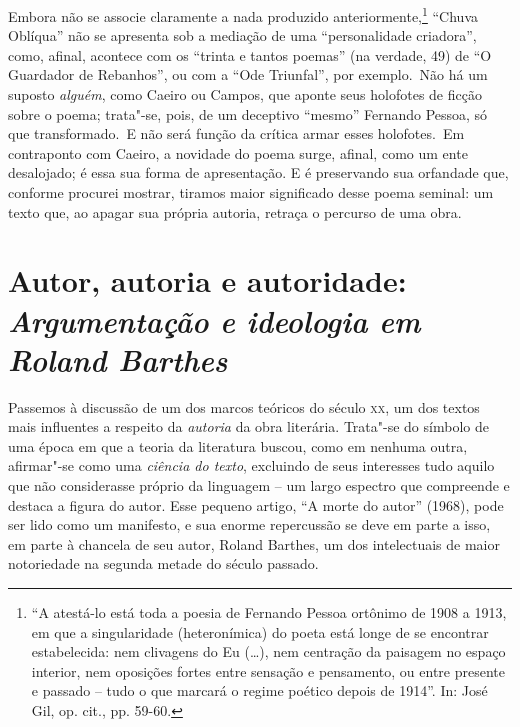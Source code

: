 Embora não se associe claramente a nada produzido
anteriormente,\footnote{``A atestá-lo está toda a poesia de Fernando
  Pessoa ortônimo de 1908 a 1913, em que a singularidade (heteronímica)
  do poeta está longe de se encontrar estabelecida: nem clivagens do Eu
  (\ldots{}), nem centração da paisagem no espaço interior, nem oposições
  fortes entre sensação e pensamento, ou entre presente e passado --
  tudo o que marcará o regime poético depois de 1914''. In: José Gil,
  op. cit., pp. 59-60.} ``Chuva Oblíqua'' não se apresenta sob a
mediação de uma ``personalidade criadora'', como, afinal, acontece com
os ``trinta e tantos poemas'' (na verdade, 49) de ``O Guardador de
Rebanhos'', ou com a ``Ode Triunfal'', por exemplo.~Não há um suposto
\emph{alguém}, como Caeiro ou Campos, que aponte seus holofotes de
ficção sobre o poema; trata"-se, pois, de um deceptivo ``mesmo'' Fernando
Pessoa, só que transformado.~E não será função da crítica armar esses
holofotes.~Em contraponto com Caeiro, a novidade do poema surge, afinal, como um ente desalojado; é
essa sua forma de apresentação. E é preservando sua orfandade que,
conforme procurei mostrar, tiramos maior significado desse poema
seminal: um texto que, ao apagar sua própria autoria, retraça o percurso
de uma obra.

\chapter*{Autor, autoria e autoridade:\\ \emph{\large Argumentação e ideologia em Roland Barthes}}




Passemos à discussão de um dos marcos teóricos do século \textsc{xx}, um
dos textos mais influentes a respeito da \emph{autoria} da obra
literária. Trata"-se do símbolo de uma época em que a teoria da
literatura buscou, como em nenhuma outra, afirmar"-se como uma
\emph{ciência do texto}, excluindo de seus interesses tudo aquilo que
não considerasse próprio da linguagem -- um largo espectro que
compreende e destaca a figura do autor. Esse pequeno artigo, ``A morte
do autor'' (1968), pode ser lido como um manifesto, e sua enorme
repercussão se deve em parte a isso, em parte à chancela de seu autor,
Roland Barthes, um dos intelectuais de maior notoriedade na segunda
metade do século passado.

